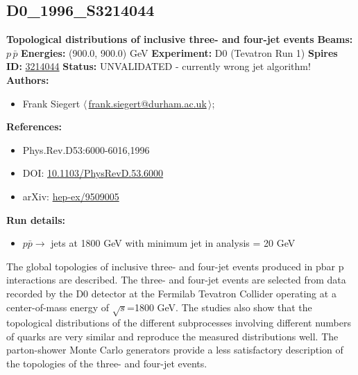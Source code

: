 \subsection[D0\_1996\_S3214044]{D0\_1996\_S3214044\,\cite{Abachi:1995zv}}
\textbf{Topological distributions of inclusive three- and four-jet events}\newline
\textbf{Beams:} $p$\,$\bar{p}$ \newline
\textbf{Energies:} (900.0, 900.0) GeV \newline
\textbf{Experiment:} D0 (Tevatron Run 1) \newline
\textbf{Spires ID:} \href{http://www.slac.stanford.edu/spires/find/hep/www?rawcmd=key+3214044}{3214044}\newline
\textbf{Status:} UNVALIDATED - currently wrong jet algorithm!\newline
\textbf{Authors:}
\begin{itemize}
  \item Frank Siegert $\langle\,$\href{mailto:frank.siegert@durham.ac.uk}{frank.siegert@durham.ac.uk}$\,\rangle$;
\end{itemize}
\textbf{References:}
\begin{itemize}
  \item Phys.Rev.D53:6000-6016,1996
  \item DOI: \href{http://dx.doi.org/10.1103/PhysRevD.53.6000}{10.1103/PhysRevD.53.6000}
  \item arXiv: \href{http://arxiv.org/abs/hep-ex/9509005}{hep-ex/9509005}
\end{itemize}
\textbf{Run details:}
\begin{itemize}

  \item $p \bar{p} \to$ jets at 1800 GeV with minimum jet \pT in analysis = 20 GeV\end{itemize}

\noindent The global topologies of inclusive three- and four-jet events produced in pbar p interactions are described. The three- and four-jet events are selected from data recorded by the D0 detector at the Fermilab Tevatron Collider operating at a center-of-mass energy of $\sqrt{s}$=1800 GeV. The studies also show that the topological distributions of the different subprocesses involving different numbers of quarks are very similar and reproduce the measured distributions well. The parton-shower Monte Carlo generators provide a less satisfactory description of the topologies of the three- and four-jet events.

